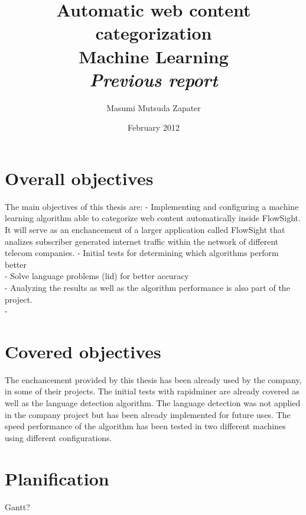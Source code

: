 \documentclass[12pt, a4paper , titlepage]{report}
\author{Masumi Mutsuda Zapater}
\title{Automatic web content categorization \\ Machine Learning \\ \large{\textit{Previous report}}}
\date{February 2012}
\begin{document}
\maketitle

\tableofcontents


\chapter{Overall objectives}
The main objectives of this thesis are:
- Implementing and configuring a machine learning algorithm able to categorize web content automatically inside FlowSight. \\
It will serve as an enchancement of a larger application called FlowSight that analizes subscriber generated internet traffic within the network of different telecom companies.
- Initial tests for determining which algorithms perform better\\
- Solve language problems (lid) for better accuracy\\
- Analyzing the results as well as the algorithm performance is also part of the project.\\
- 


\chapter{Covered objectives}
The enchancement provided by this thesis has been already used by the company, in some of their projects. 
The initial tests with rapidminer are already covered as well as the language detection algorithm. The language detection was not applied in the company project but has been already implemented
for future uses.
The speed performance of the algorithm has been tested in two different machines using different configurations.



\chapter{Planification}
Gantt?
\end{document}
